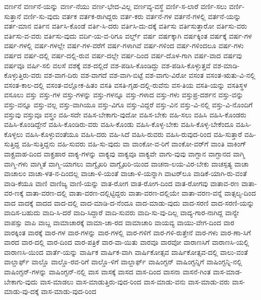 {ವರ್ಣನೆ
ವರ್ಣನೆ-ಯನ್ನು
ವರ್ಣ-ನೆಯು
ವರ್ಣ-ಭೇದ-ವಿಲ್ಲ
ವರ್ಣವ್ಯ-ವಸ್ಥೆ
ವರ್ಣಿ-ಸ-ಲಾರೆ
ವರ್ಣಿ-ಸಲು
ವರ್ಣಿ-ಸುತ್ತಾನೆ
ವರ್ಣಿ-ಸು-ವುದು
ವರ್ತಕ
ವರ್ತಕ-ರಾಗಿದ್ದರು
ವರ್ತ-ಕರು
ವರ್ತನೆ-ಗಳ
ವರ್ತನೆ-ಗಳಲ್ಲಿ
ವರ್ತನೆ-ಯನ್ನು
ವರ್ತ-ಮಾನ
ವರ್ತಿನ
ವರ್ತಿಸಿ-ಕೊಂಡೆ
ವರ್ತಿ-ಸಿ-ದರು
ವರ್ತಿಸಿ-ದು-ದಕ್ಕೆ
ವರ್ತಿಸು
ವರ್ತಿಸುತ್ತಾರೋ
ವರ್ತಿಸು-ವರು
ವರ್ತಿಸು-ವ-ವರು
ವರ್ತಿಸು-ವುದು
ವರ್ದಿ-ಯ-ವ-ರಿಗೂ
ವರ್ಲ್ಡ್
ವರ್ಷ
ವರ್ಷಕ್ಕಾಗಿ
ವರ್ಷಕ್ಕಿಂತ
ವರ್ಷಕ್ಕೆ
ವರ್ಷ-ಗಳ
ವರ್ಷ-ಗಳಲ್ಲಿ
ವರ್ಷ-ಗಳಲ್ಲೇ
ವರ್ಷ-ಗಳ-ವರೆಗೆ
ವರ್ಷ-ಗಳಾಗಿವೆ
ವರ್ಷ-ಗಳಿಂದ
ವರ್ಷ-ಗಳಿಂದಲೂ
ವರ್ಷ-ಗಳು
ವರ್ಷದ
ವರ್ಷ-ದಲ್ಲಿ
ವರ್ಷ-ದಲ್ಲಿ-ರುವ
ವರ್ಷ-ದಲ್ಲೇ
ವರ್ಷ-ದಿಂದ
ವರ್ಷ-ದೊಳ-ಗಾಗಿ
ವರ್ಷ-ವಾದ
ವರ್ಷವು
ವರ್ಷವೂ
ವರ್ಷಿ-ಸಲಿ
ವಲಸೆ
ವಶಕ್ಕೆ
ವಶ-ದಲ್ಲಿದೆ
ವಶ-ಪಡಿಸಿ-ಕೊಂಡಿದ್ದು
ವಶ-ಪಡಿಸಿ-ಕೊಳ್ಳುತ್ತವೆ
ವಶ-ಮಾಡಿ-ಕೊಳ್ಳುತ್ತಿರು-ವರು
ವಶ-ವಾಗ-ದಿರು
ವಶ-ವಾಗದೆ
ವಶ-ವಾಗಿ-ಬಿಟ್ಟೆ
ವಶ-ವಾಗು-ವಿರೋ
ವಸಂತ
ವಸಂತ-ಋತು-ವಿ-ನಲ್ಲಿ
ವಸಂತ-ಕಾಲ-ದಲ್ಲಿ
ವಸಂತ-ವಲ್ಲೋಕ-ಹಿತಂ
ವಸತಿ
ವಸತಿ-ಗೃಹ-ದಲ್ಲಿ-ರುವೆನು
ವಸ-ತಿಯ
ವಸತಿ-ಯನ್ನು
ವಸತಿಸ್ಥಳ
ವಸೂಲು
ವಸ್ತು
ವಸ್ತು-ಗಳ
ವಸ್ತು-ಗಳನ್ನು
ವಸ್ತು-ಗಳನ್ನೂ
ವಸ್ತು-ಗಳಾದ
ವಸ್ತು-ಗಳು
ವಸ್ತುಪ್ರ-ದರ್ಶನ
ವಸ್ತು-ವನ್ನು
ವಸ್ತು-ವನ್ನೂ
ವಸ್ತು-ವಲ್ಲ
ವಸ್ತು-ವಾಗಿಯೂ
ವಸ್ತು-ವಿಗೂ
ವಸ್ತು-ವಿದ್ದರೆ
ವಸ್ತು-ವಿನ
ವಸ್ತು-ವಿ-ನಲ್ಲಿ
ವಸ್ತು-ವಿ-ನೊಂದಿಗೆ
ವಸ್ತುವು
ವಸ್ತುವೂ
ವಸ್ತ್ರಂ
ವಹಿ-ಸದೇ
ವಹಿಸ-ಬೇಕಾಗು-ವುದೋ
ವಹಿಸ-ಬೇಕು
ವಹಿ-ಸಲು
ವಹಿಸಿ
ವಹಿಸಿ-ಕೊಂಡರು
ವಹಿಸಿ-ಕೊಂಡಿದ್ದೇನೆ
ವಹಿಸಿ-ಕೊಂಡಿರು-ವರು
ವಹಿಸಿ-ಕೊಂಡು
ವಹಿಸಿ-ಕೊಳ್ಳ-ಬೇಕು
ವಹಿಸಿ-ಕೊಳ್ಳ-ಬೇಕೆಂದೂ
ವಹಿಸಿ-ಕೊಳ್ಳಲು
ವಹಿಸಿ-ಕೊಳ್ಳುವಂತೆಯೂ
ವಹಿಸಿ-ದರು
ವಹಿ-ಸಿದೆ
ವಹಿಸಿ-ರುವರು
ವಹಿಸಿ-ರುವುದ-ರಿಂದ
ವಹಿ-ಸುತ್ತಾರೆ
ವಹಿ-ಸುತ್ತಿದ್ದ
ವಹಿ-ಸುತ್ತಿದ್ದನು
ವಹಿ-ಸುವರು
ವಹಿ-ಸು-ವುದು
ವಾ
ವಾಂಕೋ-ವ-ರಿಗೆ
ವಾಂಕೋ-ವರ್‌ಗೆ
ವಾಂತಿ
ವಾಕಿಂಗ್
ವಾಕ್ಪ್ರವಾಹ-ದಿಂದ
ವಾಕ್ಪ್ರಹಾರ
ವಾಕ್ಯ-ಗಳನ್ನು
ವಾಕ್ಯವು
ವಾಕ್ಯವೂ
ವಾಕ್ಯವೇ
ವಾಗು-ವುವು
ವಾಗ್ದಾನ
ವಾಗ್ದಾನದ
ವಾಗ್ಮಿ
ವಾಗ್ಮಿ-ಗಳು
ವಾಗ್ಮಿತೆ
ವಾಗ್ಮಿ-ಯಾಗಲು
ವಾಗ್ವೈಖರಿ
ವಾಗ್ವೈಖರಿ-ಯಿಂದ
ವಾಚನಾ-ಲಯ-ವಿರ-ಬೇಕು
ವಾಚಸ್ಪತ್ಯ
ವಾಚಾ
ವಾಚಾಲಂ
ವಾಚಾ-ಳತ-ನ-ದಿಂದಲ್ಲ
ವಾಚಾ-ಳಿ-ಯಂತೆ
ವಾಚಾ-ಳಿ-ಯನ್ನಾಗಿ
ವಾಟರ್‌ಲೂ
ವಾಡಿಕೆ-ಯಾಗಿ-ರು-ವಂತೆ
ವಾಡಿ-ಕೆಯೂ
ವಾಣಿ
ವಾಣಿಜ್ಯ
ವಾಣಿ-ಯನ್ನು
ವಾತ-ರೋಗ
ವಾತ-ರೋಗ-ದಿಂದ
ವಾತ-ರೋಗವು
ವಾತಾವ-ರಣ
ವಾತಾ-ವರ-ಣಕ್ಕೆ
ವಾತಾ-ವರಣ-ದಲ್ಲಿ
ವಾತಾ-ವರಣ-ದಲ್ಲಿಟ್ಟಿದ್ದರು
ವಾತಾ-ವರಣ-ದಲ್ಲಿಯೇ
ವಾತಾ-ವರಣ-ವನ್ನೆ
ವಾತ್ಸಲ್ಯ-ದಿಂದ
ವಾದ
ವಾದಕ್ಕೆ
ವಾದದ
ವಾದ-ದಲ್ಲಿ
ವಾದ-ಮಾಡಿ-ದ-ನೆಂದೂ
ವಾದ-ಮಾಡು-ವುದು
ವಾದ-ಸರಣಿ
ವಾದ-ಸರಣಿ-ಯನ್ನು
ವಾದಿಸ-ಬಹುದು
ವಾದಿ-ಸಿ-ದರೆ
ವಾದಿ-ಸಿದ್ದಾರೆ
ವಾದಿ-ಸುವರು
ವಾದಿ-ಸು-ವು-ದಿಲ್ಲ
ವಾದ್ಯ-ಗಾರ-ನಾಗಿದ್ದ
ವಾನ್ಯೇ
ವಾಪಸ್ಸು
ವಾಪಿ
ವಾಬ್ದ
ವಾಮಾಚಾರಕ್ಕೆ
ವಾಮಾ-ಚಾ-ರದ
ವಾಮಾಚಾರಿ
ವಾಯವ್ಯ
ವಾಯು-ವೇಗ-ದಿಂದ
ವಾರ
ವಾರಕ್ಕಿಂತ
ವಾರಕ್ಕೆ
ವಾರ-ಗಳ
ವಾರ-ಗಳನ್ನು
ವಾರ-ಗಳಲ್ಲಿ
ವಾರ-ಗಳಿಗೆ
ವಾರ-ಗಳಿ-ರುತ್ತೇನೆ
ವಾರ-ಗಳು
ವಾರ-ಣಾ-ಸಿಗೆ
ವಾರದ
ವಾರ-ದಲ್ಲಿ
ವಾರ-ದಿಂದ
ವಾರ-ಪತ್ರಿಕೆ
ವಾರ-ವಾ-ಯಿತು
ವಾರವೂ
ವಾರವೋ
ವಾರಾಣಸಿಗೆ
ವಾರಾಣಸಿ-ಯಲ್ಲಿ
ವಾರಾಣಸಿ-ಯಿಂದ
ವಾರ್ತೆ-ಯನ್ನು
ವಾರ್ಷಿಕ
ವಾರ್ಷಿಕ-ವಾಗಿ
ವಾರ್ಷಿಕೋತ್ಸವ
ವಾರ್ಷಿಕೋತ್ಸವ-ದಲ್ಲಿ
ವಾಲು-ವಂತೆ
ವಾಲ್ಡಾರ್ಫ್
ವಾಲ್ಡೊ
ವಾಲ್ಡೊ-ರವ-ರಿಗೆ
ವಾಲ್ಡೊ-ಳಿಗೆ
ವಾಲ್ದಾರ್ಫ್
ವಾಷಿಂಗ್ಟನ್
ವಾಷಿಂಗ್ಟನ್ನಿಗೆ
ವಾಷಿಂಗ್ಟನ್ನಿ-ನಲ್ಲಿ
ವಾಷಿಂಗ್ಟನ್‌-ಗಳನ್ನು
ವಾಷಿಂಗ್ಟನ್‌-ನಲ್ಲಿ
ವಾಸ
ವಾಸಕ್ಕೆ
ವಾಸದ
ವಾಸ-ದಿಂದ
ವಾಸನಾ
ವಾಸನೆ-ಗಿಂತ
ವಾಸ-ಮಾಡ-ಬೇಕಾಗು-ವುದು
ವಾಸ-ಮಾಡಲು
ವಾಸ-ಮಾಡುತ್ತಿರು-ವುದ-ರಿಂದ
ವಾಸ-ಮಾಡು-ವನು
ವಾಸ-ಮಾಡು-ವರು
ವಾಸ-ಮಾಡು-ವು-ದಕ್ಕೆ
ವಾಸ-ಮಾಡು-ವುದ-ರಿಂದ
}
